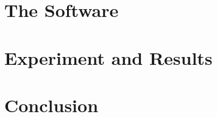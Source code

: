 \documentclass{article}
\begin{document}
\section{The Software}


\section{Experiment and Results}



\section{Conclusion}




\end{document}
